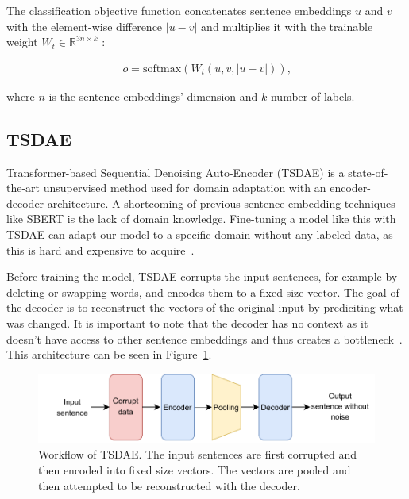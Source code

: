 \documentclass[fleqn,moreauthors,10pt]{ds_report}
\begin{document}
The classification objective function concatenates sentence embeddings \(u\) and \(v\) with the element-wise difference \(|u - v|\) and multiplies it with the trainable weight \( W_t \in \mathbb{R}^{3n \times k} \) \cite{SBERT}:

\begin{equation}
\begin{gathered}
o = \text{softmax}(W_t(u, v, |u - v|)) \text{,}
\end{gathered}
\label{eq:softmax}
\end{equation}

where $n$ is the sentence embeddings' dimension and $k$ number of labels.


\subsection*{TSDAE}

Transformer-based Sequential Denoising Auto-Encoder (TSDAE) is a state-of-the-art unsupervised method used for domain adaptation with an encoder-decoder architecture. A shortcoming of previous sentence embedding techniques like SBERT is the lack of domain knowledge. Fine-tuning a model like this with TSDAE can adapt our model to a specific domain without any labeled data, as this is hard and expensive to acquire~\cite{wang-etal-2021-tsdae-using}.

Before training the model, TSDAE corrupts the input sentences, for example by deleting or swapping words, and encodes them to a fixed size vector. The goal of the decoder is to reconstruct the vectors of the original input by prediciting what was changed. It is important to note that the decoder has no context as it doesn't have access to other sentence embeddings and thus creates a bottleneck~\cite{wang-etal-2021-tsdae-using}. This architecture can be seen in Figure~\ref{fig:tsdae}.

\begin{figure}[ht]\centering
	\vspace{12 pt}
	\includegraphics[width=\linewidth]{TSDAE_scheme.pdf}
	\vspace{5 pt}
	\caption{Workflow of TSDAE. The input sentences are first corrupted and then encoded into fixed size vectors. The vectors are pooled and then attempted to be reconstructed with the decoder.}
	\label{fig:tsdae}
\end{figure}
\end{document}
